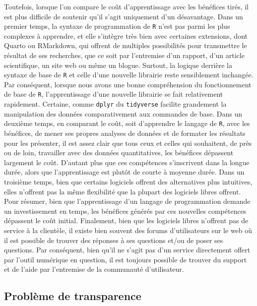\documentclass[
  letterpaper,
  DIV=11,
  numbers=noendperiod]{scrreprt}
\begin{document}
Toutefois, lorsque l'on compare le coût d'apprentissage avec les
bénéfices tirés, il est plus difficile de soutenir qu'il s'agit
uniquement d'un désavantage. Dans un premier temps, la syntaxe de
programmation de \texttt{R} n'est pas parmi les plus complexes à
apprendre, et elle s'intègre très bien avec certaines extensions, dont
Quarto ou RMarkdown, qui offrent de multiples possibilités pour
transmettre le résultat de ses recherches, que ce soit par l'entremise
d'un rapport, d'un article scientifique, un site web ou même un blogue.
Surtout, la logique derrière la syntaxe de base de \texttt{R} et celle
d'une nouvelle librairie reste sensiblement inchangée. Par conséquent,
lorsque nous avons une bonne compréhension du fonctionnement de base de
\texttt{R}, l'apprentissage d'une nouvelle librairie se fait
relativement rapidement. Certaine, comme \texttt{dplyr} du
\texttt{tidyverse} facilite grandement la manipulation des données
comparativement aux commandes de base. Dans un deuxième temps, en
comparant le coût, soit d'apprendre le langage de \texttt{R}, avec les
bénéfices, de mener ses propres analyses de données et de formater les
résultats pour les présenter, il est assez clair que tous ceux et celles
qui souhaitent, de près ou de loin, travailler avec des données
quantitatives, les bénéfices dépassent largement le coût. D'autant plus
que ces compétences s'inscrivent dans la longue durée, alors que
l'apprentissage est plutôt de courte à moyenne durée. Dans un troisième
temps, bien que certains logiciels offrent des alternatives plus
intuitives, elles n'offrent pas la même flexibilité que la plupart des
logiciels libres offrent. Pour résumer, bien que l'apprentissage d'un
langage de programmation demande un investissement en temps, les
bénéfices générés par ces nouvelles compétences dépassent le coût
initial. Finalement, bien que les logiciels libres n'offrent pas de
service à la clientèle, il existe bien souvent des forums d'utilisateurs
sur le web où il est possible de trouver des réponses à ses questions
et/ou de poser ses questions. Par conséquent, bien qu'il ne s'agit pas
d'un service directement offert par l'outil numérique en question, il
est toujours possible de trouver du support et de l'aide par l'entremise
de la communauté d'utilisateur.

\subsection{Problème de transparence}\label{probluxe8me-de-transparence}
\end{document}
